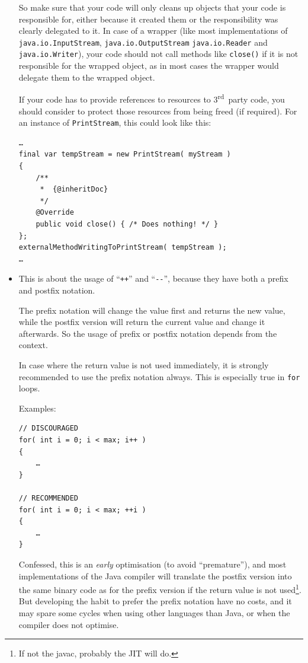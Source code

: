 \documentclass[11pt,a4paper, titlepage, parskip=half, headsepline, footsepline, cleardoublepage=current, headheight=1cm]{scrbook}
\begin{document}
\begin{itemize}
{So make sure that your code will only cleans up objects that your code is responsible for, either because it created them or the responsibility was clearly delegated to it. In case of a wrapper (like most implementations of \lstinline|java.io.InputStream|, \lstinline|java.io.OutputStream| \lstinline|java.io.Reader| and \lstinline|java.io.Writer|), your code should not call methods like \lstinline|close()| if it is not responsible for the wrapped object, as in most cases the wrapper would delegate them to the wrapped object.

If your code has to provide references to resources to 3\textsuperscript{rd}~party code, you should consider to protect those resources from being freed (if required). For an instance of \lstinline|PrintStream|, this could look like this:
\begin{lstlisting}
…
final var tempStream = new PrintStream( myStream ) 
{
    /**
     *  {@inheritDoc}
     */
    @Override
    public void close() { /* Does nothing! */ }
};
externalMethodWritingToPrintStream( tempStream );
…
\end{lstlisting}}


\item{This is about the usage of “\verb#++#” and “\verb#--#”, because they have both a prefix and postfix notation.

The prefix notation will change the value first and returns the new value, while the postfix version will return the current value and change it afterwards. So the usage of prefix or postfix notation depends from the context.

In case where the return value is not used immediately, it is strongly recommended to use the prefix notation always. This is especially true in \lstinline|for| loops.

Examples:
\begin{lstlisting}
// DISCOURAGED
for( int i = 0; i < max; i++ )
{
    …
}

// RECOMMENDED
for( int i = 0; i < max; ++i )
{
    …
}
\end{lstlisting}

Confessed, this is an \textit{early} optimisation (to avoid “premature”), and most implementations of the Java compiler will translate the postfix version into the same binary code as for the prefix version if the return value is not used\footnote{If not the javac, probably the JIT will do.}. But developing the habit to prefer the prefix notation have no costs, and it may spare some cycles when using other languages than Java, or when the compiler does not optimise.}\label{item:PrefixVsPostfix}


\end{itemize}
\end{document}
